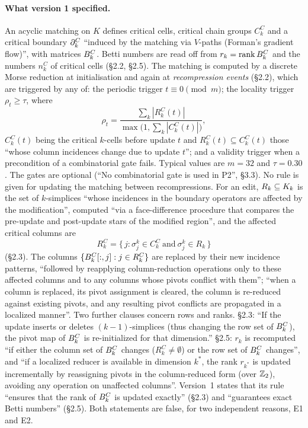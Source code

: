 \paragraph{What version 1 specified.}
An acyclic matching on $K$ defines critical cells, critical chain groups
$C_k^C$ and a critical boundary $\partial_k^C$ ``induced by the matching via
$V$-paths (Forman's gradient flow)'', with matrices $B_{k}^C$. Betti numbers
are read off from $r_k=\operatorname{rank}B_{k}^C$ and the numbers $n_k^C$ of critical cells
(\S2.2, \S2.5). The matching is computed by a discrete Morse reduction at
initialisation and again at \emph{recompression events} (\S2.2), which are
triggered by any of: the periodic trigger $t\equiv0\pmod m$; the locality
trigger $\rho_t\ge\tau$, where
\[
  \rho_t=\frac{\sum_k|R_k^C(t)|}{\max\bigl(1,\sum_k|C_k^C(t)|\bigr)},
\]
$C_k^C(t)$ being the critical $k$-cells before update $t$ and
$R_k^C(t)\subseteq C_k^C(t)$ those ``whose column incidences change due to
update $t$''; and a validity trigger when a precondition of a combinatorial gate
fails. Typical values are $m=32$ and $\tau=0.30$. The gates are optional
(``No combinatorial gate is used in P2'', \S3.3). No rule is given for updating
the matching between recompressions. For an edit, $R_k\subseteq K_{k}$ is the set
of $k$-simplices ``whose incidences in the boundary operators are affected by
the modification'', computed ``via a face-difference procedure that compares
the pre-update and post-update stars of the modified region'', and the affected
critical columns are
\[
  R_k^C=\{\,j : \sigma_j^k\in C_k^C\ \text{and}\ \sigma_j^k\in R_k\,\}
\]
(\S2.3). The columns $\{B_{k}^C[:,j] : j\in R_k^C\}$ are replaced by their new
incidence patterns, ``followed by reapplying column-reduction operations only to
these affected columns and to any columns whose pivots conflict with them'';
``when a column is replaced, its pivot assignment is cleared, the column is
re-reduced against existing pivots, and any resulting pivot conflicts are
propagated in a localized manner''. Two further clauses concern rows and
ranks. \S2.3: ``If the update inserts or deletes $(k{-}1)$-simplices (thus
changing the row set of $B_{k}^C$), the pivot map of $B_{k}^C$ is
re-initialized for that dimension.'' \S2.5: $r_k$ is recomputed ``if either the
column set of $B_{k}^C$ changes ($R_k^C\ne\emptyset$) or the row set of
$B_{k}^C$ changes'', and ``if a localized reducer is available in dimension
$k^*$, the rank $r_{k^*}$ is updated incrementally by reassigning pivots in the
column-reduced form (over $\mathbb{Z}_2$), avoiding any operation on unaffected columns''.
Version~1 states that its rule ``ensures that the rank of $B_{k}^C$ is updated
exactly'' (\S2.3) and ``guarantees exact Betti numbers'' (\S2.5). Both
statements are false, for two independent reasons, E1 and E2.

